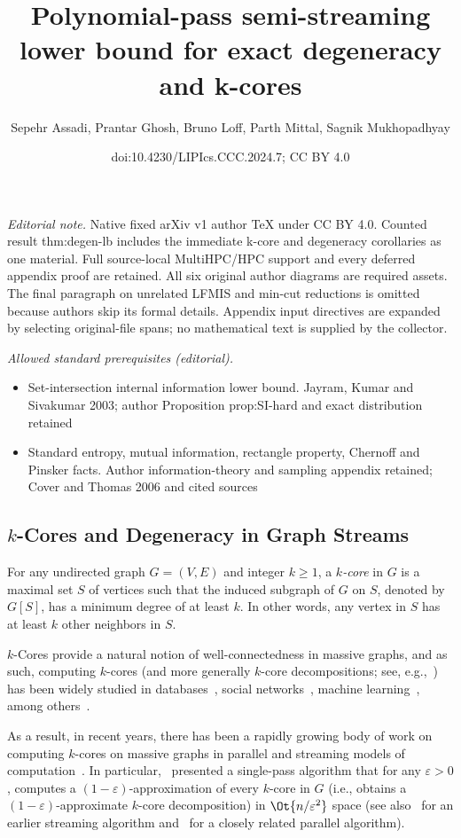 \documentclass[11pt,letterpaper]{article}
\title{Polynomial-pass semi-streaming lower bound for exact degeneracy and k-cores}
\author{Sepehr Assadi, Prantar Ghosh, Bruno Loff, Parth Mittal, Sagnik Mukhopadhyay}
\date{doi:10.4230/LIPIcs.CCC.2024.7; CC BY 4.0}
\newcommand{\eps}{\varepsilon}
\renewcommand{\geq}{\geqslant}
\theoremstyle{definition}
\begin{document}
\maketitle
\setcounter{section}{2}
\noindent\textit{Editorial note.} Native fixed arXiv v1 author TeX under CC BY 4.0. Counted result thm:degen-lb includes the immediate k-core and degeneracy corollaries as one material. Full source-local MultiHPC/HPC support and every deferred appendix proof are retained. All six original author diagrams are required assets. The final paragraph on unrelated LFMIS and min-cut reductions is omitted because authors skip its formal details. Appendix input directives are expanded by selecting original-file spans; no mathematical text is supplied by the collector.\par\medskip
\noindent\textit{Allowed standard prerequisites (editorial).}\begin{itemize}
\item Set-intersection internal information lower bound. Jayram, Kumar and Sivakumar 2003; author Proposition prop:SI-hard and exact distribution retained
\item Standard entropy, mutual information, rectangle property, Chernoff and Pinsker facts. Author information-theory and sampling appendix retained; Cover and Thomas 2006 and cited sources
\end{itemize}\medskip
\subsection{\texorpdfstring{$k$-Cores}{k-Cores} and Degeneracy in Graph Streams}\label{sec:degen-intro}

For any undirected graph $G=(V,E)$ and integer $k \geq 1$, a \emph{$k$-core} in $G$ is a maximal set $S$ of vertices such that the induced subgraph of $G$ on $S$, denoted by $G[S]$, has a minimum degree of at least $k$. In other words, 
any vertex in $S$ has at least $k$ other neighbors in $S$. 

$k$-Cores provide a natural notion of well-connectedness in massive graphs, and as such, computing $k$-cores (and more generally $k$-core decompositions; see, e.g.,~\cite{LiuSYDS22}) 
has been widely studied in databases~\cite{BonchiGKV14, ChuZ00ZXZ20, LiZZQZL19}, social networks~\cite{DhulipalaBS17, DhulipalaBS18, KhaouidBST15}, machine learning~\cite{Alvarez-HamelinDBV05, EsfandiariLM18, GhaffariLM19}, 
among others~\cite{LiWSX18,GalimbertiBGL20, SariyuceGJWC13}. 

As a result, in recent years, there has been a rapidly growing body of work on
computing $k$-cores on massive graphs in parallel and streaming
models of computation~\cite{SariyuceGJWC13,DhulipalaBS17, DhulipalaBS18,EsfandiariLM18, GhaffariLM19,LiuSYDS22}. In particular,~\cite{EsfandiariLM18} presented a single-pass algorithm that for any $\eps > 0$, 
computes a $(1-\eps)$-approximation of every $k$-core in $G$ (i.e., obtains a $(1-\eps)$-approximate $k$-core decomposition) in $\Ot{n/\eps^2}$ space (see also~\cite{SariyuceGJWC13} for an earlier streaming algorithm and~\cite{GhaffariLM19}
for a closely related parallel algorithm). 
\end{document}
